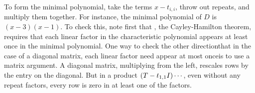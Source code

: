 \begin{exercises}
\begin{answer}
       To form the minimal polynomial, 
       take the terms \( x-t_{i,i} \), throw out repeats, 
       and multiply them together.
       For instance, the minimal polynomial of $D$
       is \( (x-3)(x-1) \).
       To check this, note first that , 
       the Cayley-Hamilton theorem, requires that each linear factor in the
       characteristic polynomial appears at least once in the minimal
       polynomial.
       One way to check the other direction\Dash that in the case of
       a diagonal matrix, 
       each linear factor need appear at most once\Dash is to
       use a matrix argument.
       A diagonal matrix, multiplying from the left, rescales rows by
       the entry on the diagonal.
       But in a product $(T-t_{1,1}I)\cdots\hbox{}$, even without any repeat
       factors, every row is zero in at least one of the factors. 


\end{answer}
\end{exercises}
